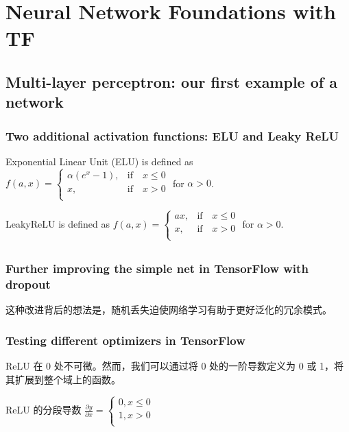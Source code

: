 \chapter{Neural Network Foundations with TF}
\section{Multi-layer perceptron: our first example of a network}
\subsection{Two additional activation functions: ELU and Leaky ReLU}
Exponential Linear Unit (ELU) is defined as
$
    f(a, x)=\begin{cases}
        \alpha(e^x-1), & \text{if} \quad x \leq 0 \\
        x,             & \text{if} \quad x > 0    \\
    \end{cases}
$
for $\alpha > 0$.

LeakyReLU is defined as
$
    f(a, x)=\begin{cases}
        ax, & \text{if} \quad x \leq 0 \\
        x,  & \text{if} \quad x > 0    \\
    \end{cases}
$
for $\alpha > 0$.

\section{}
\subsection{Further improving the simple net in TensorFlow with dropout}
这种改进背后的想法是，随机丢失迫使网络学习有助于更好泛化的冗余模式。

\subsection{Testing different optimizers in TensorFlow}
ReLU 在 0 处不可微。然而，我们可以通过将 0 处的一阶导数定义为 0 或 1，将其扩展到整个域上的函数。

ReLU 的分段导数
$\frac{\partial y}{\partial x}=
    \begin{cases}
        0, x\leq 0 \\
        1, x> 0    \\
    \end{cases}
$